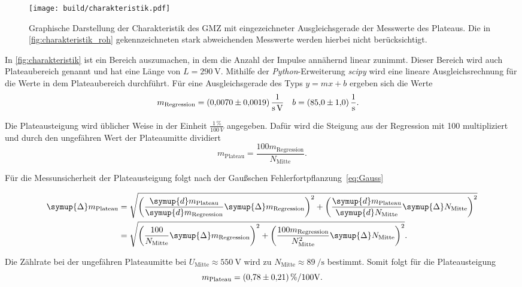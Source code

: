 \begin{figure}[H]
    \centering
    \texttt{[image: build/charakteristik.pdf]}
    \caption{Graphische Darstellung der Charakteristik des GMZ mit eingezeichneter Ausgleichsgerade der %
    Messwerte des Plateaus. Die in \autoref{fig:charakteristik_roh} gekennzeichneten stark abweichenden %
    Messwerte werden hierbei nicht berücksichtigt.}
    \label{fig:charakteristik}
\end{figure}

In \autoref{fig:charakteristik} ist ein Bereich auszumachen, in dem die Anzahl der Impulse annähernd linear
zunimmt. Dieser Bereich wird auch Plateaubereich genannt und hat eine Länge von $L=\qty{290}{\volt}$. Mithilfe der \textit{Python}-Erweiterung \textit{scipy} \cite{scipy} wird eine lineare Ausgleichsrechnung
für die Werte in dem Plateaubereich durchführt. Für eine Ausgleichsgerade des Typs $y=mx + b$ ergeben sich die
Werte
\begin{align*}
    m_{\text{Regression}} &= \qty{0.0070+-0.0019}{\per\second\per\volt} & b &= \qty{85.0+-1.0}{\per\second}.
\end{align*}

Die Plateausteigung wird üblicher Weise in der Einheit $\frac{1\,\%}{100\,V}$ angegeben. Dafür wird die Steigung aus der Regression mit 100 multipliziert 
und durch den ungefähren Wert der Plateaumitte dividiert
\begin{equation*}
    m_{\text{Plateau}} = \frac{100 m_{\text{Regression}}}{N_{\text{Mitte}}}.
\end{equation*}

Für die Messunsicherheit der Plateausteigung folgt nach der Gaußschen Fehlerfortpflanzung~\eqref{eq:Gauss}

\begin{align*}
    \symup{\Delta}m_{\text{Plateau}} &= \sqrt{\left(\frac{\symup{d}m_{\text{Plateau}}}{\symup{d}m_{\text{Regression}}}\symup{\Delta} m_{\text{Regression}} \right)^2 + %
     \left(\frac{\symup{d}m_{\text{Plateau}}}{\symup{d}N_{\text{Mitte}}}\symup{\Delta} N_{\text{Mitte}} \right)^2} \\
     &=\sqrt{\left(\frac{100}{N_{\text{Mitte}}}\symup{\Delta} m_{\text{Regression}}\right)^2 + \left(\frac{100 m_{\text{Regression}}}{N_{\text{Mitte}}^2}\symup{\Delta} N_{\text{Mitte}}\right)^2}.
\end{align*}

Die Zählrate bei der ungefähren Plateaumitte bei $U_{\text{Mitte}}\approx \qty{550}{\volt}$ wird zu $N_{\text{Mitte}} \approx \qty{89}{\per\second}$
bestimmt. Somit folgt für die Plateausteigung
\begin{equation*}
    m_{\text{Plateau}} = \qty{0.78+-0.21}{\percent\per100\volt}.
\end{equation*}

